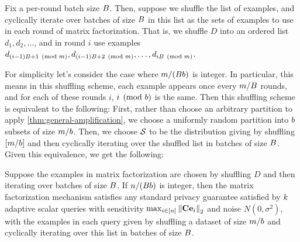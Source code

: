 \documentclass{article}
\begin{document}
 Fix a per-round batch size $B$. Then, suppose we shuffle the list of examples, and cyclically iterate over batches of size $B$ in this list as the sets of examples to use in each round of matrix factorization. That is, we shuffle $D$ into an ordered list $d_1, d_2, \ldots$, and in round $i$ use examples $d_{(i-1)B + 1 \pmod {m}}, d_{(i-1)B + 2\pmod {m}}, \ldots, d_{iB \pmod {m}}$. 

For simplicity let's consider the case where $m / (B b)$ is integer. In particular, this means in this shuffling scheme, each example appears once every $m / B$ rounds, and for each of these rounds $i$, $i \pmod {b}$ is the same. Then this shuffling scheme is equivalent to the following: First, rather than choose an arbitrary partition to apply \cref{thm:general-amplification}, we choose a uniformly random partition into $b$ subsets of size $m / b$. Then, we choose $\mathcal{S}$ to be the distribution giving by shuffling $[m / b]$ and then cyclically iterating over the shuffled list in batches of size $B$. Given this equivalence, we get the following:

\begin{cor}\label{cor:amplification-by-shuffling}
Suppose the examples in matrix factorization are chosen by shuffling $D$ and then iterating over batches of size $B$. If $n / (B b)$ is integer, then the matrix factorization mechanism satisfies any standard privacy guarantee satisfied by  $k$ adaptive scalar queries with sensitivity $\max_{i \in [n]} \left\|\mathbf{C} \mathbf{e}_i\right\|_2$ and noise $N(0, \sigma^2)$, with the examples in each query given by shuffling a dataset of size $m / b$ and cyclically iterating over this list in batches of size $B$.
\end{cor}

\end{document}
